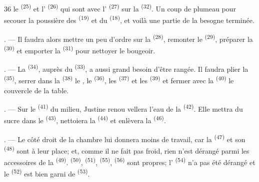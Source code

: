 \begin{VUpage}[38]{36}
\VUcontinue
{} le  \textsuperscript{(25)} et l' \textsuperscript{(26)} qui sont avec\nl
l' \textsuperscript{(27)} sur la  \textsuperscript{(32)}. Un coup\nl
de plumeau pour secouer la poussière des  \textsuperscript{(19)}\nl
et du  \textsuperscript{(18)}, et voilà une partie de la besogne\nl
terminée.

. --- Il faudra alors mettre un peu d'ordre sur la\nl
{} \textsuperscript{(28)}, remonter le  \textsuperscript{(29)},\nl
préparer la  \textsuperscript{(30)} et emporter la  \textsuperscript{(31)}\nl
pour nettoyer le bougeoir.

. --- La  \textsuperscript{(34)}, auprès du\nl
{} \textsuperscript{(33)}, a aussi grand besoin d'être rangée. Il\nl
faudra plier la  \textsuperscript{(35)}, serrer dans la \nl
{} \textsuperscript{(38)} le , le  \textsuperscript{(36)}, les  \textsuperscript{(37)} et les\nl
{} \textsuperscript{(39)} et fermer avec la  \textsuperscript{(40)} le couvercle\nl
de la table.

. --- Sur le  \textsuperscript{(41)} du milieu, Justine renou\cc
vellera l'eau de la  \textsuperscript{(42)}. Elle mettra du sucre\nl
dans le  \textsuperscript{(43)}, nettoiera la  \textsuperscript{(44)}\nl
et enlèvera la  \textsuperscript{(46)}.

. --- Le côté droit de la chambre lui donnera\nl
moins de travail, car la  \textsuperscript{(47)} et son\nl
{} \textsuperscript{(48)} sont à leur place; et, comme il ne fait\nl
pas froid, rien n'est dérangé parmi les accessoires de\nl
la  \textsuperscript{(49)}.  \textsuperscript{(50)},  \textsuperscript{(51)}, \cc
{} \textsuperscript{(55)},  \textsuperscript{(56)} sont propres; l' \textsuperscript{(54)}\nl
n'a pas été dérangé et le  \textsuperscript{(52)} est bien\nl
garni de  \textsuperscript{(53)}.


\end{VUpage}
